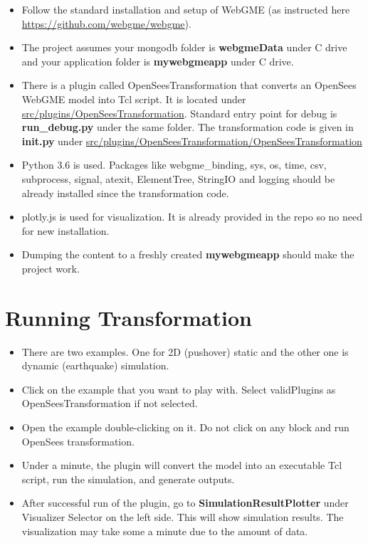 \documentclass[letterpaper]{article}
\begin{document}
	\begin{itemize}
		\item Follow the standard installation and setup of WebGME (as instructed here \url{https://github.com/webgme/webgme}).
		\item The project assumes your mongodb folder is \textbf{webgmeData} under C drive and your application folder is \textbf{mywebgmeapp} under C drive.
		\item There is a plugin called OpenSeesTransformation that converts an OpenSees WebGME model into Tcl script. It is located under \url{src/plugins/OpenSeesTransformation}. Standard entry point for debug is \textbf{run\_debug.py} under the same folder. The transformation code is given in \textbf{init.py} under \url{src/plugins/OpenSeesTransformation/OpenSeesTransformation}
		\item Python 3.6 is used. Packages like webgme\_binding, sys, os, time, csv, subprocess, signal, atexit, ElementTree, StringIO and logging should be already installed since the transformation code.
		\item plotly.js is used for visualization. It is already provided in the repo so no need for new installation.
		\item Dumping the content to a freshly created \textbf{mywebgmeapp} should make the project work.
	\end{itemize}

	\section*{Running Transformation}
	\begin{itemize}
		\item There are two examples. One for 2D (pushover) static and the other one is dynamic (earthquake) simulation.
		\item Click on the example that you want to play with. Select validPlugins as OpenSeesTransformation if not selected.
		\item Open the example double-clicking on it. Do not click on any block and run OpenSees transformation.
		\item Under a minute, the plugin will convert the model into an executable Tcl script, run the simulation, and generate outputs.
		\item After successful run of the plugin, go to \textbf{SimulationResultPlotter} under Visualizer Selector on the left side. This will show simulation results. The visualization may take some a minute due to the amount of data.
	\end{itemize}
\end{document}
